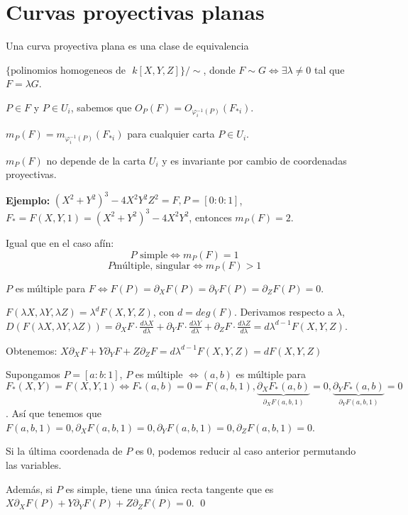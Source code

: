 \chapter{Curvas proyectivas planas}

\begin{Def}
  Una curva proyectiva plana es una clase de equivalencia 

  $\{ \text{polinomios homogeneos de }$ $k[X,Y,Z] \} /  \sim $, donde $F \sim G \Leftrightarrow \exists \lambda \neq 0$ tal que $F=\lambda G$.
  
\end{Def}

\begin{nota}
$P\in F$ y $P\in U_i$, sabemos que $O_P(F)=O_{\varphi_i^{-1}(P)}(F_{*i})$.
\end{nota}

\begin{Def}
$m_P(F)=m_{\varphi_i^{-1}(P)}(F_{*i})$ para cualquier carta $P\in U_i$. 
\end{Def}

\begin{nota}
$m_P(F)$ no depende de la carta $U_i$ y es invariante por cambio de coordenadas proyectivas. 
\end{nota}

\textbf{Ejemplo:} $(X^2+Y^2)^3-4X^2Y^2Z^2=F, P=[0:0:1]$, $F_*=F(X,Y,1)=(X^2+Y^2)^3-4X^2Y^2$, entonces $m_P(F)=2$.

\vspace{4mm}

Igual que en el caso afín:
$$P \text{ simple} \Leftrightarrow m_P(F)=1$$
$$P \text{múltiple, singular} \Leftrightarrow m_P(F)>1$$

\begin{Lem}
$P$ es múltiple para $F \Leftrightarrow F(P)=\partial_XF(P)=\partial_YF(P)=\partial_ZF(P)=0$. 
\end{Lem}

\begin{Dem}
  $F(\lambda X, \lambda Y, \lambda Z)=\lambda^dF(X,Y,Z)$, con $d=deg(F)$. Derivamos respecto a $\lambda$, $D(F(\lambda X, \lambda Y, \lambda Z))= \partial_XF\cdot \frac{d\lambda X}{d\lambda}+\partial_YF\cdot \frac{d\lambda Y}{d\lambda}+\partial_ZF\cdot \frac{d\lambda Z}{d\lambda}= d\lambda^{d-1}F(X,Y,Z)$.

  Obtenemos: $X\partial_XF+Y\partial_YF+Z\partial_ZF=d\lambda^{d-1}F(X,Y,Z)=dF(X,Y,Z)$

  Supongamos $P=[a:b:1]$, $P$ es múltiple $\Leftrightarrow (a,b)$ es múltiple para $F_*(X,Y)=F(X,Y,1) \Leftrightarrow F_*(a,b)=0=F(a,b,1), \underbrace{\partial_X F_*(a,b)}_{\partial_X F(a,b,1)} =0, \underbrace{\partial_YF_*(a,b)}_{\partial_Y F(a,b,1)}=0$.  Así que tenemos que $F(a,b,1)=0, \partial_XF(a,b,1)=0, \partial_YF(a,b,1)=0, \partial_ZF(a,b,1)=0$.

  Si la última coordenada de $P$ es $0$, podemos reducir al caso anterior permutando las variables.

  Además, si $P$ es simple, tiene una única recta tangente que es $X\partial_XF(P)+Y\partial_YF(P)+Z\partial_ZF(P)=0$. \qed
\end{Dem}

